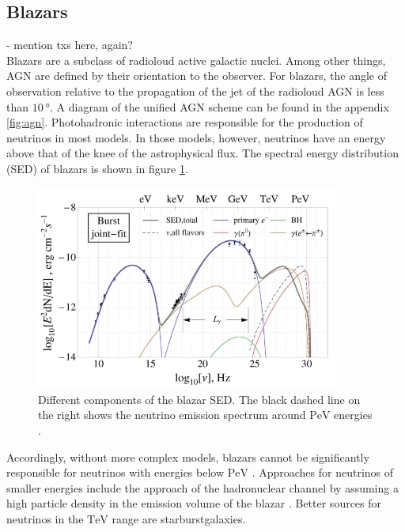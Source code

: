 \subsection{Blazars}
- mention txs here, again? \\
Blazars are a subclass of radioloud active galactic nuclei.
Among other things, AGN are defined by their orientation to the observer.
For blazars, the angle of observation relative to the propagation of the jet of the radioloud AGN is less than $\SI{10}{\degree}$.
A diagram of the unified AGN scheme can be found in the appendix \ref{fig:agn}.
Photohadronic interactions are responsible for the production of neutrinos in most models.
In those models, however, neutrinos have an energy above that of the knee of the astrophysical flux.
The spectral energy distribution (SED) of blazars is shown in figure \ref{fig:sed}.
\begin{figure}
    \centering
    \includegraphics[width=10cm]{Plots/01_5_astroparticle/sed.jpeg}
    \caption{Different components of the blazar SED. The black dashed line on the right shows the neutrino emission spectrum around $\si{\peta\electronvolt}$ energies \cite{sed}.}
    \label{fig:sed}
\end{figure}
Accordingly, without more complex models, blazars cannot be significantly responsible for neutrinos with energies below $\si{\peta\electronvolt}$ \cite{blazar}.
Approaches for neutrinos of smaller energies include the approach of the hadronuclear channel by assuming a high particle density in the emission volume of the blazar \cite{eichmann}.
Better sources for neutrinos in the $\si{\tera\electronvolt}$ range are starburstgalaxies.


